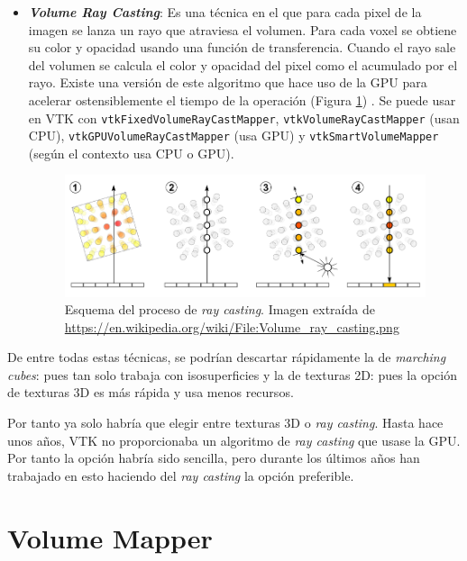 \begin{itemize}
	\item \textbf{\textit{Volume Ray Casting}}: Es una técnica en el que para cada pixel de la imagen se lanza un rayo que atraviesa el volumen. Para cada voxel se obtiene su color y opacidad usando una función de transferencia. Cuando el rayo sale del volumen se calcula el color y opacidad del pixel como el acumulado por el rayo. Existe una versión de este algoritmo que hace uso de la GPU para acelerar ostensiblemente el tiempo de la operación (Figura \ref{fig:volume_ray_casting}) \cite{intro_medical_vtk_bioimage}. Se puede usar en VTK con \texttt{vtkFixedVolumeRayCastMapper}, \texttt{vtkVolumeRayCastMapper} (usan CPU), \texttt{vtkGPUVolumeRayCastMapper} (usa GPU) y \texttt{vtkSmartVolumeMapper} (según el contexto usa CPU o GPU).
	\begin{figure}[H]
		\centering
		\includegraphics[width=12.5cm]{imagenes/volume_ray_casting}
		\caption{Esquema del proceso de \textit{ray casting}. Imagen extraída de \url{https://en.wikipedia.org/wiki/File:Volume_ray_casting.png}}
		\label{fig:volume_ray_casting}
	\end{figure}
\end{itemize}

De entre todas estas técnicas, se podrían descartar rápidamente la de \textit{marching cubes}: pues tan solo trabaja con isosuperficies y la de texturas 2D: pues la opción de texturas 3D es más rápida y usa menos recursos.

Por tanto ya solo habría que elegir entre texturas 3D o \textit{ray casting}. Hasta hace unos años, VTK no proporcionaba un algoritmo de \textit{ray casting} que usase la GPU. Por tanto la opción habría sido sencilla, pero durante los últimos años han trabajado en esto haciendo del \textit{ray casting} la opción preferible.

\section{Volume Mapper}

